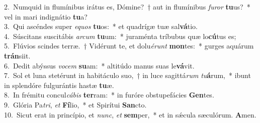 {2.~}Numquid in flumínibus irátus es, Dómine?~† aut in flumínibus \textit{fu}\textit{ror} \textbf{tu}us?~* vel in mari indignátio \textbf{tu}a?\\
{3.~}Qui ascéndes super \textit{e}\textit{quos} \textbf{tu}os:~* et quadrígæ tuæ sal\textbf{vá}tio.\\
{4.~}Súscitans suscitábis \textit{ar}\textit{cum} \textbf{tu}um:~* juraménta tríbubus quæ lo\textbf{cú}tus es;\\
{5.~}Flúvios scindes terræ.~† Vidérunt te, et dolu\textit{é}\textit{runt} \textbf{mon}tes:~* gurges aquárum \textbf{trán}siit.\\
{6.~}Dedit abýssus \textit{vo}\textit{cem} \textbf{su}am:~* altitúdo manus suas le\textbf{vá}vit.\\
{7.~}Sol et luna stetérunt in habitáculo suo,~† in luce sagittá\textit{rum} \textit{tu}\textbf{á}rum,~* ibunt in splendóre fulgurántis hastæ \textbf{tu}æ.\\
{8.~}In frémitu concul\textit{cá}\textit{bis} \textbf{ter}ram:~* in furóre obstupefácies \textbf{Gen}tes.\\
{9.~}Glória Pa\textit{tri}, \textit{et} \textbf{Fí}lio,~* et Spirítui \textbf{San}cto.\\
{10.~}Sicut erat in princípio, et \textit{nunc}, \textit{et} \textbf{sem}per,~* et in sǽcula sæculórum. \textbf{A}men.\\
